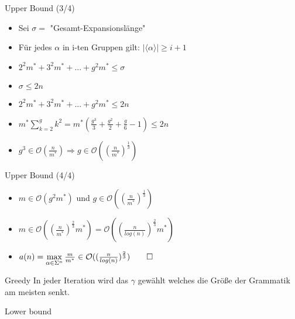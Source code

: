 \begin{frame}{\FrameName}
	\begin{block}{Upper Bound (3/4)}
    \begin{itemize}[<+->]
      \item Sei $\sigma = $ "Gesamt-Expansionslänge"
      \item Für jedes $\alpha$ in i-ten Gruppen gilt: $|\langle \alpha \rangle | \ge i+1$ 
      \item $2^2m^* + 3^2m^* + ... + g^2m^* \le \sigma$
      \item $\sigma \le 2n$
      \item $2^2m^* + 3^2m^* + ... + g^2m^* \le 2n$
      \item $m^* \sum_{k=2}^{g}k^2 = m^* (\frac{g^3}{3} + \frac{g^2}{2} + \frac{g}{6} - 1) \le 2n$
      \item $g^3 \in \mathcal{O}(\frac{n}{m^*}) \Rightarrow g \in \mathcal{O}((\frac{n}{m^*})^{\frac{1}{3}})$
    \end{itemize}
\end{block}
\end{frame}

\begin{frame}{\FrameName}
	\begin{block}{Upper Bound (4/4)}
    \begin{itemize}[<+->]
      \item $m\in \mathcal{O}(g^2 m^*)$ und $g \in \mathcal{O}((\frac{n}{m^*})^{\frac{1}{3}})$
      \item $m \in \mathcal{O}((\frac{n}{m^*})^{\frac{2}{3}} m^*) = \mathcal{O}((\frac{n}{log (n)})^{\frac{2}{3}} m^*)$
      \item $a(n) = \max\limits_{\alpha \in \Sigma^n} \frac{m}{m^*} \in \mathcal{O}((\frac{n}{log(n)})^{\frac{2}{3}}) \qed$
    \end{itemize}
\end{block}
\end{frame}

\begin{frame}{\FrameName}
	\begin{block}{Greedy}
    \Gap
    In jeder Iteration wird das $\gamma $ gewählt welches die Größe der Grammatik am meisten senkt.
\end{block}
\end{frame}

\begin{frame}{\FrameName}
	\begin{block}{Lower bound}
    \Gap
    
\end{block}
\end{frame}

